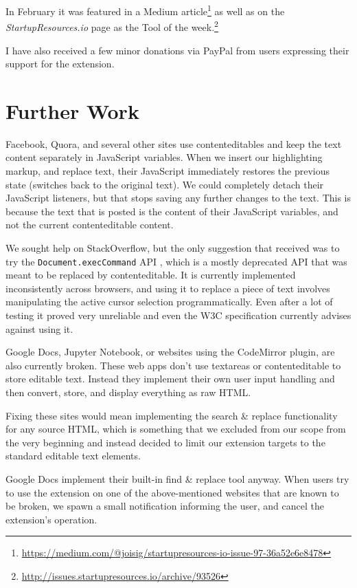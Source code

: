 \documentclass[bsc,frontabs,twoside,singlespacing,parskip,deptreport]{infthesis}
\begin{document}
In February it was featured in a Medium article\footnote{\url{https://medium.com/@joisig/startupresources-io-issue-97-36a52e6e8478}} as well as on the \textit{StartupResources.io} page as the Tool of the week.\footnote{\url{http://issues.startupresources.io/archive/93526}}

I have also received a few minor donations via PayPal from users expressing their support for the extension.

\section{Further Work}
Facebook, Quora, and several other sites use contenteditables and keep the text content separately in JavaScript variables. When we insert our highlighting markup, and replace text, their JavaScript immediately restores the previous state (switches back to the original text). We could completely detach their JavaScript listeners, but that stops saving any further changes to the text. This is because the text that is posted is the content of their JavaScript variables, and not the current contenteditable content.

We sought help on StackOverflow, but the only suggestion that received was to try the \texttt{Document.execCommand} API \cite{A10}, which is a mostly deprecated API that was meant to be replaced by contenteditable. It is currently implemented inconsistently across browsers, and using it to replace a piece of text involves manipulating the active cursor selection programmatically. Even after a lot of testing it proved very unreliable and even the W3C specification currently advises against using it.

Google Docs, Jupyter Notebook, or websites using the CodeMirror plugin, are also currently broken. These web apps don't use textareas or contenteditable to store editable text. Instead they implement their own user input handling and then convert, store, and display everything as raw HTML.

Fixing these sites would mean implementing the search \& replace functionality for any source HTML, which is something that we excluded from our scope from the very beginning and instead decided to limit our extension targets to the standard editable text elements.

Google Docs implement their built-in find \& replace tool anyway. When users try to use the extension on one of the above-mentioned websites that are known to be broken, we spawn a small notification informing the user, and cancel the extension's operation.
\end{document}
